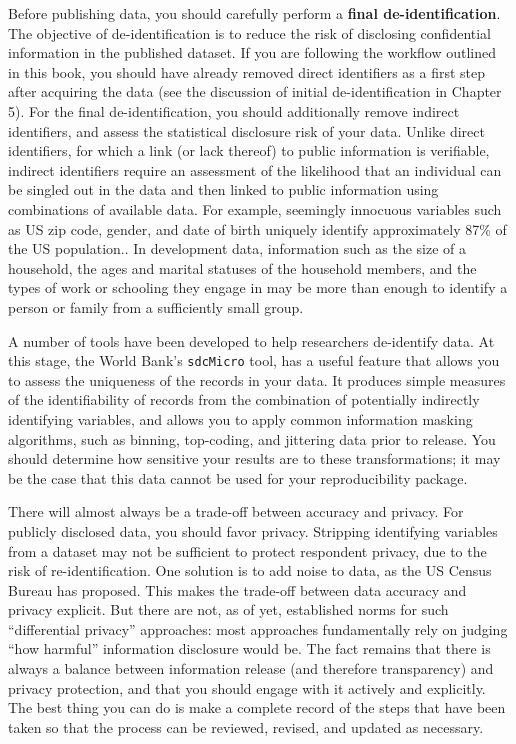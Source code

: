Before publishing data,
you should carefully perform a \textbf{final de-identification}.
The objective of de-identification is to reduce the risk of disclosing confidential information in the published dataset.
If you are following the workflow outlined in this book,
you should have already removed direct identifiers as a first step after acquiring the data
(see the discussion of initial de-identification in Chapter 5).
For the final de-identification, you should additionally remove
indirect identifiers, and assess the statistical disclosure risk of your data.
Unlike direct identifiers, for which a link (or lack thereof) to public information is verifiable,
indirect identifiers require an assessment of the likelihood
that an individual can be singled out in the data
and then linked to public information using combinations of available data.
For example, seemingly innocuous variables such as US zip code,
gender, and date of birth uniquely identify
approximately 87\% of the US population.\cite{Sweeney2000}.
In development data, information such as the size of a household,
the ages and marital statuses of the household members,
and the types of work or schooling they engage in
may be more than enough to identify a person or family
from a sufficiently small group.

A number of tools have been developed to help researchers de-identify data.
At this stage, the World Bank's \texttt{sdcMicro} tool,
has a useful feature
that allows you to assess the uniqueness of the records in your data.
It produces simple measures of the identifiability of records from
the combination of potentially indirectly identifying variables,
and allows you to apply common information masking algorithms,
such as binning, top-coding, and jittering data prior to release.
You should determine how sensitive your results are to these transformations;
it may be the case that this data cannot be used for your reproducibility package.

There will almost always be a trade-off between accuracy and privacy.
For publicly disclosed data, you should favor privacy.
Stripping identifying variables from a dataset may not be sufficient to protect respondent privacy,
due to the risk of re-identification.
One solution is to add noise to data, as the US Census Bureau has proposed.\cite{abowd2018us}
This makes the trade-off between data accuracy and privacy explicit.
But there are not, as of yet, established norms for such ``differential privacy'' approaches:
most approaches fundamentally rely on judging ``how harmful'' information disclosure would be.
The fact remains that there is always a balance between information release (and therefore transparency)
and privacy protection, and that you should engage with it actively and explicitly.
The best thing you can do is make a complete record of the steps that have been taken
so that the process can be reviewed, revised, and updated as necessary.

